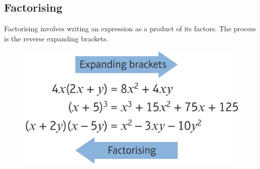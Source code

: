 
\subsection{Factorising}
Factorising involves writing an expression as a product of its factors. The process is the reverse expanding brackets.
\begin{figure}[H]
    \centering
    \includegraphics[scale=0.3]{Mathematics/Pure Mathematics/Ch1/Images/Ch1-3-1.png}
\end{figure}
